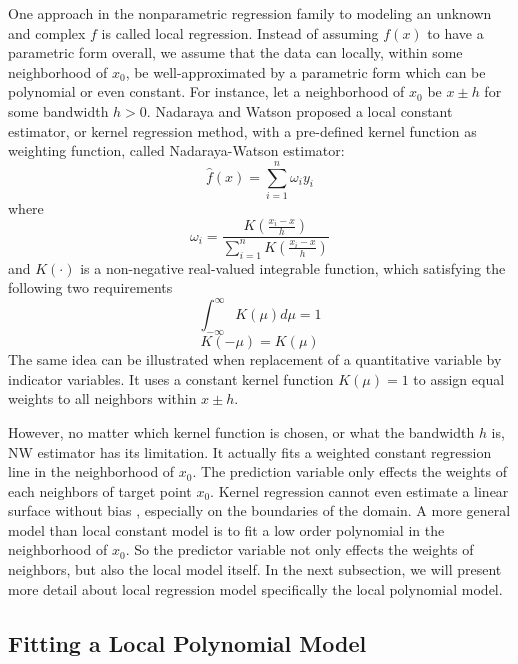 One approach in the nonparametric regression family to modeling an unknown and
complex $f$ is called local regression. Instead of assuming 
$f(x)$ to have a parametric form overall, we assume that the data can locally, 
within some neighborhood of $x_0$, be well-approximated by a parametric form which 
can be polynomial or even constant. For instance, let a neighborhood of $x_0$ be
$x \pm h$ for some bandwidth $h > 0$.
Nadaraya \cite{nadaraya1964} and Watson \cite{watson1964} proposed a local 
constant estimator, or kernel regression method, with a pre-defined kernel 
function as weighting function, called Nadaraya-Watson estimator:
\begin{equation} 
\hat f(x) = \sum_{i=1}^{n} \omega_{i}y_i
\end{equation} 
where 
\begin{equation} 
\omega_i = \frac{ K(\frac{x_i - x}{h})}{\sum_{i=1}^n K(\frac{x_i - x}{h})}
\end{equation} 
and $K(\cdot)$ is a non-negative real-valued integrable function, which satisfying 
the following two requirements
\begin{equation} 
\int_{-\infty}^{\infty} K(\mu)d\mu = 1
\end{equation} 
\begin{equation} 
K(-\mu) = K(\mu)
\end{equation}
The same idea can be illustrated when replacement of a quantitative variable by
indicator variables. It uses a constant kernel function $K(\mu) = 1$ to assign
equal weights to all neighbors within $x\pm h$. 

However, no matter which kernel function is chosen, or what the bandwidth $h$ is,
NW estimator has its limitation. It actually fits a weighted constant regression
line in the neighborhood of $x_0$. The prediction variable only effects the weights
of each neighbors of target point $x_0$. Kernel regression cannot even estimate 
a linear surface without bias \cite{cleveland1988regression}, especially on the 
boundaries of the domain. A more general model than local constant
model is to fit a low order polynomial in the neighborhood of $x_0$. So the predictor
variable not only effects the weights of neighbors, but also the local model itself.
In the next subsection, we will present more detail about local regression model
specifically the local polynomial model.

\subsection{Fitting a Local Polynomial Model}
\label{sec:loess}

